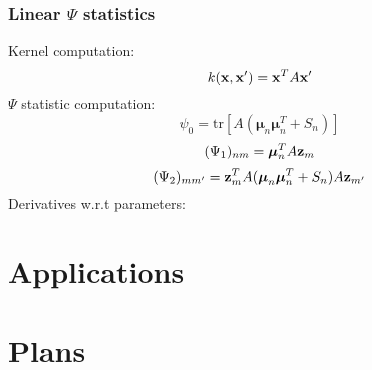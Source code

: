 \documentclass[11pt, a4paper]{article}
\begin{document}
\subsubsection{Linear $\Psi$ statistics}
\label{sec:linpsistat}
Kernel computation:
\begin{equation}
  k({\bf x,x}') = {\bf x}^T A {\bf x}'
\end{equation}
$\Psi$ statistic computation:
\begin{equation}
  \psi_0 = \text{tr}[A(\boldsymbol{\mu}_n\boldsymbol{\mu}^T_n+S_n)]
\end{equation}
\begin{equation}
  (\Psi_1)_{nm} = \boldsymbol{\mu}_n^TA{\bf z}_m
\end{equation}
\begin{equation}
  (\Psi_2)_{mm'} = {\bf z}^T_mA(\boldsymbol{\mu}_n\boldsymbol{\mu}_n^T+S_n)A{\bf z}_{m'}
\end{equation}
Derivatives w.r.t parameters:

\section{Applications}
\label{sec:applications}


\section{Plans}
\label{sec:plans}





\end{document}
